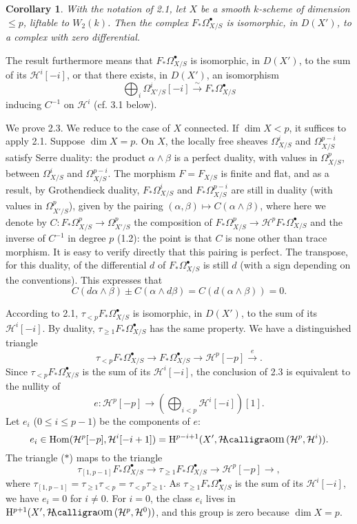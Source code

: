 \documentclass[10pt,reqno]{article}
\renewcommand{\H}{\mathrm{H}}
\newcommand{\HH}{\mathcal{H}}
\newcommand{\al}{_\ast}
\newcommand{\bh}{^\bullet}
\DeclareMathOperator{\Hom}{Hom}
\DeclareMathOperator{\SHom}{\mathcal{H}\text{\kern -3pt {\calligra\large om}}\,}
\theoremstyle{plain}
\newtheorem{coro}[thm]{Corollary}
\theoremstyle{definition}
\begin{document}
\begin{coro}
With the notation of 2.1, let $X$ be a smooth $k$-scheme of dimension $\leq p$, liftable to $W_2(k)$. Then
the complex $F\al\Omega_{X/S}\bh$ is isomorphic, in $D(X')$, to a complex with zero differential.
\end{coro}

The result furthermore means that $F\al\Omega_{X/S}\bh$ is isomorphic, in $D(X')$, to the sum of
its $\HH^i[-i]$, or that there exists, in $D(X')$, an isomorphism
\[
  \bigoplus_i\Omega_{X'/S}^i[-i]\xrightarrow{\ \sim\ }F\al\Omega_{X/S}\bh
\]
inducing $C^{-1}$ on $\HH^i$ (cf. 3.1 below).

We prove 2.3. We reduce to the case of $X$ connected. If $\dim X<p$, it suffices
to apply 2.1. Suppose $\dim X=p$. On $X$, the locally free sheaves $\Omega_{X/S}^i$
and $\Omega_{X/S}^{p-i}$ satisfy Serre duality: the product $\alpha\wedge\beta$ is a perfect duality,
with values in $\Omega_{X/S}^p$, between $\Omega_{X/S}^i$ and $\Omega_{X/S}^{p-i}$. The morphism $F=F_{X/S}$
is finite and flat, and as a result, by Grothendieck duality, $F\al\Omega_{X/S}^i$ and $F\al\Omega_{X/S}^{p-i}$
are still in duality (with values in $\Omega_{X'/S}^p$), given by the pairing $(\alpha,\beta)\mapsto C(\alpha\wedge\beta)$,
where here we denote by $C:F\al\Omega_{X/S}^p\to\Omega_{X'/S}^p$  the composition of $F\al\Omega_{X/S}^p\to\HH^p F\al\Omega_{X/S}\bh$
and the inverse of $C^{-1}$ in degree $p$ (1.2): the point is that $C$ is none other than trace morphism. It is
easy to verify directly that this pairing is perfect. The transpose, for this duality, of the differential $d$ of
$F\al\Omega_{X/S}\bh$ is still $d$ (with a sign depending on the conventions). This expresses that
\[
  C(d\alpha\wedge\beta)\pm C(\alpha\wedge d\beta)=C(d(\alpha\wedge\beta))=0.
\]

According to 2.1, $\tau_{<p}F\al\Omega_{X/S}\bh$ is isomorphic, in $D(X')$, to the sum of its $\HH^i[-i]$. By duality,
$\tau_{\geq 1}F\al\Omega_{X/S}\bh$ has the same property. We have a distinguished triangle
\[
  \tau_{<p}F\al\Omega_{X/S}\bh\longrightarrow F\al\Omega_{X/S}\bh\longrightarrow\HH^p[-p]\xrightarrow{\ e\ }.\tag{$\ast$}
\]
Since $\tau_{<p}F\al\Omega_{X/S}\bh$ is the sum of its $\HH^i[-i]$, the conclusion of 2.3 is equivalent to the nullity of
\[
  e:\HH^p[-p]\longrightarrow\left(\bigoplus_{i<p}\HH^i[-i]\right)[1].
\]
Let $e_i$ ($0\leq i\leq p-1$) be the components of $e$:
\[
  e_i\in\Hom(\HH^p[-p],\HH^i[-i+1])=\H^{p-i+1}(X',\SHom(\HH^p,\HH^i)).
\]
The triangle ($\ast$) maps to the triangle
\[
  \tau_{[1,p-1]}F\al\Omega_{X/S}\bh\longrightarrow\tau_{\geq 1}F\al\Omega_{X/S}\bh\longrightarrow\HH^p[-p]\longrightarrow,
\]
where $\tau_{[1,p-1]}=\tau_{\geq 1}\tau_{<p}=\tau_{<p}\tau_{\geq 1}$. As $\tau_{\geq 1}F\al\Omega_{X/S}\bh$ is the sum
of its $\HH^i[-i]$, we have $e_i=0$ for $i\neq 0$. For $i=0$, the class $e_i$ lives in $\H^{p+1}(X',\SHom(\HH^p,\HH^0))$, and this
group is zero because $\dim X=p$.
\end{document}
